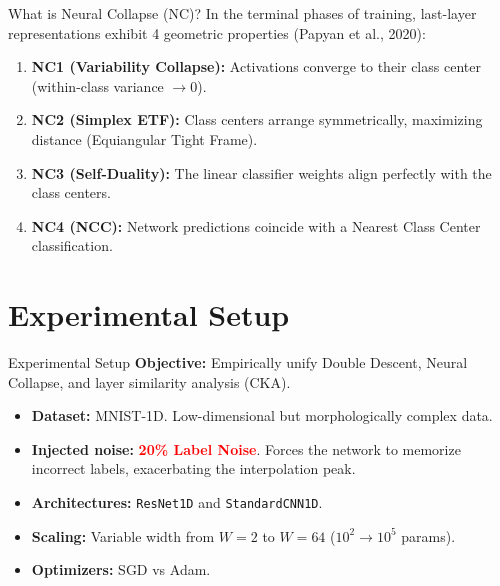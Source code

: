 \documentclass[aspectratio=169, 10pt]{beamer}
\begin{document}
\begin{frame}{What is Neural Collapse (NC)?}
    In the terminal phases of training, last-layer representations exhibit 4 geometric properties (Papyan et al., 2020):
    \vspace{0.3cm}
    \begin{enumerate}
        \item \textbf{NC1 (Variability Collapse):} Activations converge to their class center (within-class variance $\to 0$).
        \item \textbf{NC2 (Simplex ETF):} Class centers arrange symmetrically, maximizing distance (Equiangular Tight Frame).
        \item \textbf{NC3 (Self-Duality):} The linear classifier weights align perfectly with the class centers.
        \item \textbf{NC4 (NCC):} Network predictions coincide with a Nearest Class Center classification.
    \end{enumerate}
\end{frame}

\section{Experimental Setup}

\begin{frame}{Experimental Setup}
    \textbf{Objective:} Empirically unify Double Descent, Neural Collapse, and layer similarity analysis (CKA).
    
    \vspace{0.3cm}
    \begin{itemize}
        \item \textbf{Dataset:} MNIST-1D. Low-dimensional but morphologically complex data.
        \item \textbf{Injected noise:} \textcolor{red}{\textbf{20\% Label Noise}}. Forces the network to memorize incorrect labels, exacerbating the interpolation peak.
        \item \textbf{Architectures:} \texttt{ResNet1D} and \texttt{StandardCNN1D}.
        \item \textbf{Scaling:} Variable width from $W=2$ to $W=64$ ($10^2 \to 10^5$ params).
        \item \textbf{Optimizers:} SGD vs Adam.
    \end{itemize}
\end{frame}
\end{document}
